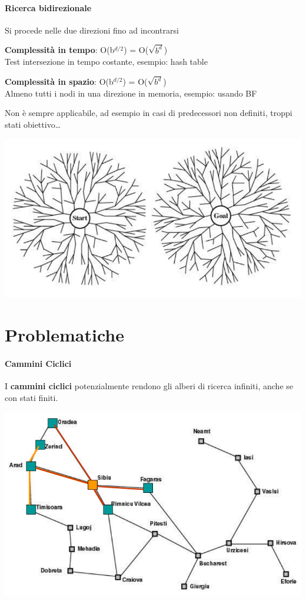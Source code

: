 \documentclass[10pt]{book}
\begin{document}
\paragraph{Ricerca bidirezionale} Si procede nelle due direzioni fino ad incontrarsi
\begin{multicols}{2}
\begin{list}{}{}
	\item \textbf{Complessità in tempo}: O(b$^{d/2}$) = O($\sqrt{b^d}$)\\Test intersezione in tempo costante, esempio: hash table
	\item \textbf{Complessità in spazio}: O(b$^{d/2}$) = O($\sqrt{b^d}$)\\Almeno tutti i nodi in una direzione in memoria, esempio: usando BF
\end{list}
Non è sempre applicabile, ad esempio in casi di predecessori non definiti, troppi stati obiettivo\ldots
\begin{center}
	\includegraphics[scale=0.5]{ricbidirez.png}
\end{center}
\end{multicols}
\section{Problematiche}
\paragraph{Cammini Ciclici}
I \textbf{cammini ciclici} potenzialmente rendono gli alberi di ricerca infiniti, anche se con stati finiti.
\begin{center}
	\includegraphics[scale=0.7]{camminiciclici.png}
\end{center}
\end{document}
